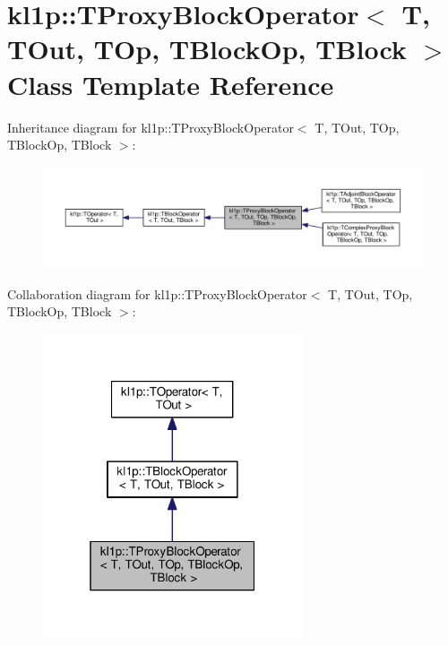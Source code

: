 \hypertarget{classkl1p_1_1TProxyBlockOperator}{}\section{kl1p\+:\+:T\+Proxy\+Block\+Operator$<$ T, T\+Out, T\+Op, T\+Block\+Op, T\+Block $>$ Class Template Reference}
\label{classkl1p_1_1TProxyBlockOperator}


Inheritance diagram for kl1p\+:\+:T\+Proxy\+Block\+Operator$<$ T, T\+Out, T\+Op, T\+Block\+Op, T\+Block $>$\+:
\nopagebreak
\begin{figure}[H]
\begin{center}
\leavevmode
\includegraphics[width=350pt]{classkl1p_1_1TProxyBlockOperator__inherit__graph}
\end{center}
\end{figure}


Collaboration diagram for kl1p\+:\+:T\+Proxy\+Block\+Operator$<$ T, T\+Out, T\+Op, T\+Block\+Op, T\+Block $>$\+:
\nopagebreak
\begin{figure}[H]
\begin{center}
\leavevmode
\includegraphics[width=217pt]{classkl1p_1_1TProxyBlockOperator__coll__graph}
\end{center}
\end{figure}
